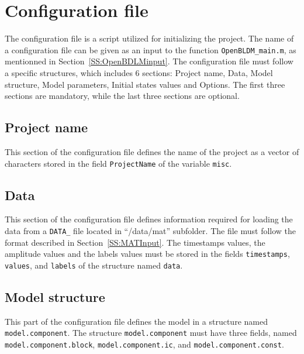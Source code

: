 \section{Configuration file}
\label{S:CFGFile}


The configuration file is a \MATLAB{} script utilized for initializing the project.
The name of a configuration file can be given as an input to the function   \lstinline[basicstyle = \mlttfamily \small ]!OpenBLDM_main.m!, as mentionned in Section~\ref{SS:OpenBDLMinput}.
The configuration file must follow a specific structures, which includes 6 sections: Project name, Data, Model structure, Model parameters, Initial states values and Options.
The first three sections are mandatory, while the last three sections are optional.

\subsection{Project name}
This section of the configuration file defines the name of the project as a vector of characters stored in the field \lstinline[basicstyle = \mlttfamily \small ]!ProjectName! of the \MATLAB{} variable \lstinline[basicstyle = \mlttfamily \small ]!misc!.

\subsection{Data}

This section of the configuration file defines information required for loading the data from a \lstinline[basicstyle = \mlttfamily \small ]!DATA_! file located in ``/data/mat'' subfolder.
The file must follow the format described in Section~\ref{SS:MATInput}.
The timestamps values, the amplitude values and the labels values must be stored in the fields \lstinline[basicstyle = \mlttfamily \small]!timestamps!, \lstinline[basicstyle = \mlttfamily \small]!values!, and \lstinline[basicstyle = \mlttfamily \small]!labels! of the \MATLAB{} structure named \lstinline[basicstyle = \mlttfamily \small]!data!.

\subsection{Model structure}
\label{SS:ModelComponents}
This part of the configuration file defines the model in a \MATLAB{} structure named \lstinline[basicstyle = \mlttfamily \small]!model.component!.
The structure \lstinline[basicstyle = \mlttfamily \small]!model.component! must have three fields, named \lstinline[basicstyle = \mlttfamily \small]!model.component.block!, \lstinline[basicstyle = \mlttfamily \small]!model.component.ic!, and \lstinline[basicstyle = \mlttfamily \small]!model.component.const!.

